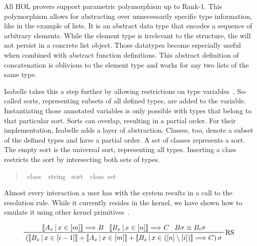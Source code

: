 All HOL provers support parametric polymorphism up to Rank-1.
This polymorphism allows for abstracting over unnecessarily specific type information, like in the example of lists.
It is an abstract data type that encodes a sequence of arbitrary elements.
While the element type is irrelevant to the structure, the  will not persist in a concrete list object.
Those datatypes become especially useful when combined with abstract function definitions.
This abstract definition of concatenation is oblivious to the element type and works for any two lists of the same type.


Isabelle takes this a step further by allowing restrictions on type variables~\parencite{Nipkow93}.
So-called sorts, representing subsets of all defined types, are added to the variable.
Instantiating those annotated variables is only possible with types that belong to that particular sort.
Sorts can overlap, resulting in a partial order.
For their implementation, Isabelle adds a layer of abstraction.
Classes, too, denote a subset of the defined types and have a partial order.
A set of classes represents a sort.
The empty sort is the universal sort, representing all types.
Inserting a class restricts the sort by intersecting both sets of types.

\begin{quote}
    \begin{isabelle}
        \ class\ {\isacharequal}\ string \isanewline
        \ sort\ {\isacharequal}\ class\ set
    \end{isabelle}
\end{quote}

Almost every interaction a user has with the system results in a call to the resolution rule.
While it currently resides in the kernel, we have shown how to emulate it using other kernel primitives~\parencite{Madge17}.

\begin{displaymath}
    \prftree[r]{RS}
    {\left\llbracket A_x\,\middle|\, x \in \left[ m \right] \right\rrbracket \Longrightarrow B}
    {\left\llbracket B_x\,\middle|\, x \in \left[ n \right] \right\rrbracket \Longrightarrow C}
    {B\sigma \equiv B_i\sigma}
    {\left( \left\llbracket B_x\,\middle|\, x \in \left[ i - 1 \right] \right\rrbracket
        + \left\llbracket A_x\,\middle|\, x \in \left[ m \right] \right\rrbracket
        + \left\llbracket B_x\,\middle|\, x \in \left( \left[ n \right] \setminus \left[ i \right] \right) \right\rrbracket
        \Longrightarrow C \right) \sigma
    }
\end{displaymath}

